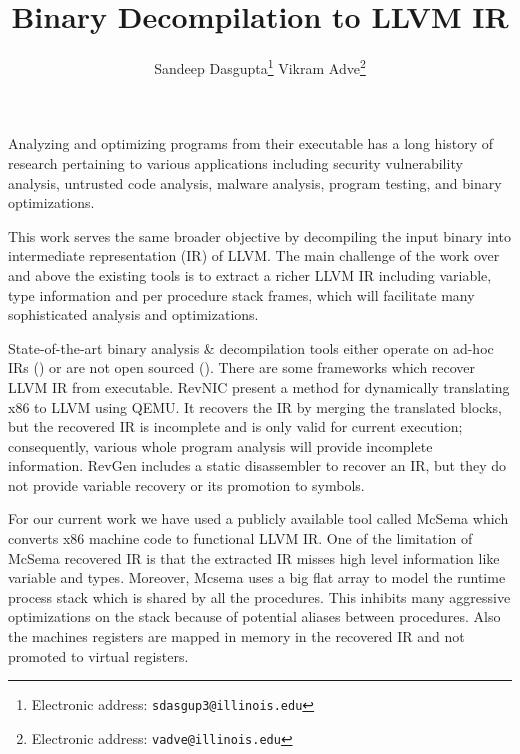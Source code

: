 \documentclass[10pt,twoside]{article}
\date{}
\title{\textbf{ Binary Decompilation to LLVM IR}}
\author{Sandeep Dasgupta\thanks{Electronic address: \texttt{sdasgup3@illinois.edu}}
\qquad Vikram Adve\thanks{Electronic address: \texttt{vadve@illinois.edu}}
}
\begin{document}
\thispagestyle{empty}

\maketitle

Analyzing and optimizing programs from their executable has a long history of
research pertaining to various applications including  security vulnerability
analysis, untrusted code analysis, malware analysis, program testing, and
binary optimizations. 

This work serves the same broader objective by decompiling the input binary
into intermediate representation (IR) of LLVM.  The main challenge of the work over
and above the existing tools is to extract a richer LLVM IR  including
variable, type information and per procedure stack frames, which
will facilitate many sophisticated analysis and optimizations.

State-of-the-art binary analysis \& decompilation tools either operate on
ad-hoc IRs (\cite{HexRays, Codesurfer, BAP}) or are
not open sourced (\cite{HexRays, Codesurfer, BAP,SECONDWRITE-EUROSYS-2013,
DIVINE-VMCAI-2007,POLYTYPEINFERENCE-PLDI-2016}).  There are some frameworks
which recover LLVM IR from executable.  RevNIC \cite{REVNIC-EUROSYS-2010}
present a method for dynamically translating x86 to LLVM using
QEMU\cite{QEMU-ATEC-2005}.  It recovers the IR by merging the translated
blocks, but the recovered IR is incomplete and is only valid for current
execution; consequently, various whole program analysis will provide incomplete
information. RevGen \cite{REVGEN-DNSW-2011} includes a static disassembler to
recover an IR, but they do not provide variable recovery or its promotion to
symbols.
  

For our current work we have used a publicly available tool called McSema
\cite{Mcsema}  which converts x86 machine code to functional LLVM IR.  
One of the limitation of McSema recovered IR is that the
extracted IR misses high level information like variable and types.  Moreover,
Mcsema uses a big flat array to model the runtime process stack which is shared
by all the procedures. This inhibits many aggressive optimizations on the stack
because of potential aliases between procedures. Also the machines
registers are mapped in memory in the recovered IR and not promoted to virtual
registers. 
\end{document}
